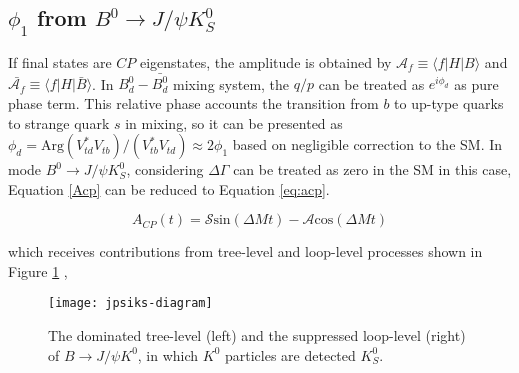 \subsection{$\phi_1$  from $B^0 \to J/\psi K^0_S$}
If final states are $CP$ eigenstates, the amplitude is obtained by $\mathcal{A}_f \equiv \langle f|H|B\rangle$ and $\bar{\mathcal{A}_f} \equiv \langle f|H|\bar{B}\rangle$. In $B_d^0-\bar{B_d^0}$ mixing system, the $q/p$ can be treated as $e^{i\phi_d}$ as pure phase term. This relative phase accounts the transition from $b$ to up-type quarks to strange quark $s$ in mixing, so it can be presented as $\phi_d = \text{Arg}(V^*_{td}V_{tb})/(V^*_{tb}V_{td}) \approx 2\phi_1 $ based on negligible correction to the SM. In mode $B^0 \to J/\psi K^0_S$, considering $\Delta \Gamma$ can be treated as zero in the SM in this case\cite{dighe2001width}, Equation \ref{Acp} can be reduced to Equation \ref{eq:acp}.

\begin{equation}\label{eq:acp}
	A_{CP}(t)=\mathcal{S} \text{sin}(\Delta{M}t)- \mathcal{A}\text{cos}(\Delta{M}t)
\end{equation}

\begin{comment}
Usually, $S_f$ provides a good sensitivity to $\phi_1$ in Eq(1.42) by replacing $\phi_d$ inside $\lambda_f$ since the rest two equations canceled out the complex phase of $(q/p)$. For instance, in the process of  $b\to \bar{c}cs$ ,the amplitude contributions from tree level and loop level diagram can be written in a form as follows using the CKM unitary condition: 
\end{comment}
which receives contributions from tree-level and loop-level processes shown in Figure \ref{fig:jpsiks} , 

\begin{figure}[htpb]
	\centering
	\texttt{[image: jpsiks-diagram]}
	\caption{The dominated tree-level (left) and the suppressed loop-level (right) of $B\to J/\psi K^0$, in which $K^0$ particles are detected $K_S^0$\cite{wishahi2014measurement}.}
	\label{fig:jpsiks}
\end{figure}


